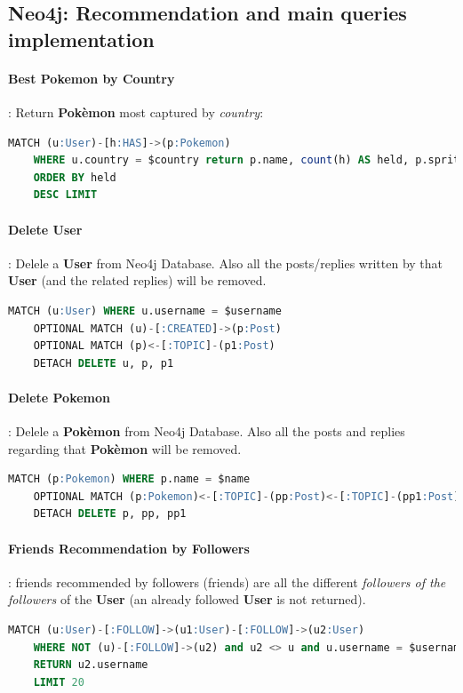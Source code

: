 \subsection{Neo4j: Recommendation and main queries implementation}

\paragraph{Best Pokemon by Country}: Return \textbf{Pokèmon} most captured by \textit{country}:
\begin{lstlisting}[language=SQL]
	MATCH (u:User)-[h:HAS]->(p:Pokemon) 
	WHERE u.country = $country return p.name, count(h) AS held, p.sprite 
	ORDER BY held 
	DESC LIMIT
\end{lstlisting}

\paragraph{Delete User}: Delele a \textbf{User} from Neo4j Database. Also all the posts/replies written by that \textbf{User} (and the related replies) will be removed. 
\begin{lstlisting}[language=SQL]
	MATCH (u:User) WHERE u.username = $username 
	OPTIONAL MATCH (u)-[:CREATED]->(p:Post)
	OPTIONAL MATCH (p)<-[:TOPIC]-(p1:Post)
	DETACH DELETE u, p, p1
\end{lstlisting}

\paragraph{Delete Pokemon}: Delele a \textbf{Pokèmon} from Neo4j Database. Also all the posts and replies regarding that \textbf{Pokèmon} will be removed. 
\begin{lstlisting}[language=SQL]
	MATCH (p:Pokemon) WHERE p.name = $name
	OPTIONAL MATCH (p:Pokemon)<-[:TOPIC]-(pp:Post)<-[:TOPIC]-(pp1:Post) 
	DETACH DELETE p, pp, pp1
\end{lstlisting}

\paragraph{Friends Recommendation by Followers}: friends recommended by followers (friends) are all the different \textit{followers of the followers} of the \textbf{User} (an already followed \textbf{User} is not returned).
\begin{lstlisting}[language=SQL]
	MATCH (u:User)-[:FOLLOW]->(u1:User)-[:FOLLOW]->(u2:User) 
	WHERE NOT (u)-[:FOLLOW]->(u2) and u2 <> u and u.username = $username 
	RETURN u2.username 
	LIMIT 20 
\end{lstlisting}
